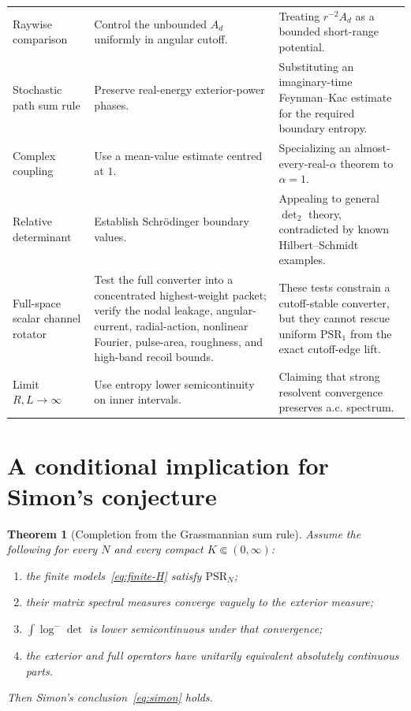 \documentclass[11pt]{article}
\newtheorem{theorem}{Theorem}[section]
\theoremstyle{definition}
\theoremstyle{remark}
\begin{document}
\begin{longtable}{>{\raggedright\arraybackslash}p{}>{\raggedright\arraybackslash}p{}>{\raggedright\arraybackslash}p{}}
Raywise comparison & Control the unbounded $A_d$ uniformly in angular cutoff. & Treating $r^{-2}A_d$ as a bounded short-range potential. \\
Stochastic path sum rule & Preserve real-energy exterior-power phases. & Substituting an imaginary-time Feynman--Kac estimate for the required boundary entropy. \\
Complex coupling & Use a mean-value estimate centred at $1$. & Specializing an almost-every-real-$\alpha$ theorem to $\alpha=1$. \\
Relative determinant & Establish Schr\"odinger boundary values. & Appealing to general $\det_2$ theory, contradicted by known Hilbert--Schmidt examples. \\
Full-space scalar channel rotator & Test the full converter into a concentrated highest-weight packet; verify the nodal leakage, angular-current, radial-action, nonlinear Fourier, pulse-area, roughness, and high-band recoil bounds. & These tests constrain a cutoff-stable converter, but they cannot rescue uniform $\mathrm{PSR}_1$ from the exact cutoff-edge lift. \\
Limit $R,L\to\infty$ & Use entropy lower semicontinuity on inner intervals. & Claiming that strong resolvent convergence preserves a.c. spectrum. \\
\bottomrule
\end{longtable}

\section{A conditional implication for Simon's conjecture}

\begin{theorem}[Completion from the Grassmannian sum rule]\label{thm:completion}
Assume the following for every $N$ and every compact $K\Subset(0,\infty)$:
\begin{enumerate}[label=(\alph*)]
 \item the finite models~\eqref{eq:finite-H} satisfy $\mathrm{PSR}_N$;
 \item their matrix spectral measures converge vaguely to the exterior measure;
 \item $\int\log^-\det$ is lower semicontinuous under that convergence;
 \item the exterior and full operators have unitarily equivalent absolutely continuous parts.
\end{enumerate}
Then Simon's conclusion~\eqref{eq:simon} holds.
\end{theorem}
\end{document}
